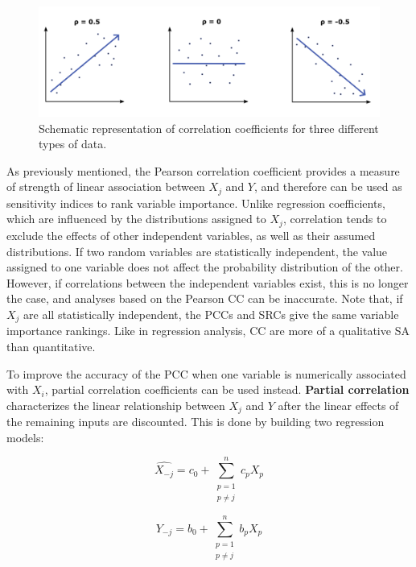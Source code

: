 \documentclass[12pt]{article}
\begin{document}
{\begin{figure}[h]
	\centering
	\includegraphics[width=0.7
	\textwidth]{images/correlation3.png}
	\caption{Schematic representation of correlation coefficients for three different types of data.}
	\label{fig:correlation2}
\end{figure}

As previously mentioned, the Pearson correlation coefficient provides a measure of strength of linear association between $X_{j}$ and $Y$, and therefore can be used as sensitivity indices to rank variable importance. Unlike regression coefficients, which are influenced by the distributions assigned to $X_{j}$, correlation tends to exclude the effects of other independent variables, as well as their assumed distributions.  If two random variables are statistically independent, the value assigned to one variable does not affect the probability distribution of the other. However, if correlations between the independent variables exist, this is no longer the case, and analyses based on the Pearson CC can be inaccurate. Note that, if $X_{j}$ are all statistically independent, the PCCs and SRCs give the same variable importance rankings. Like in regression analysis, CC are more of a qualitative SA than quantitative.

\vspace{0.5cm}
To improve the accuracy of the PCC when one variable is numerically associated with $X_{i}$, partial correlation coefficients can be used instead.  \textbf{Partial correlation} characterizes the linear relationship between  $X_{j}$ and  $Y$ after the linear effects of the remaining inputs are discounted. This is done by building two regression models: 

\begin{equation}
	\widehat{X_{-j}}= c_{0}+\sum^{n}_{\substack{p=1\\p\neq j}} c_{p}X_{p}
\end{equation}

\begin{equation}
\widehat{Y_{-j}}= b_{0}+\sum^{n}_{\substack{p=1\\p\neq j}} b_{p}X_{p}
\end{equation}

}
\end{document}

